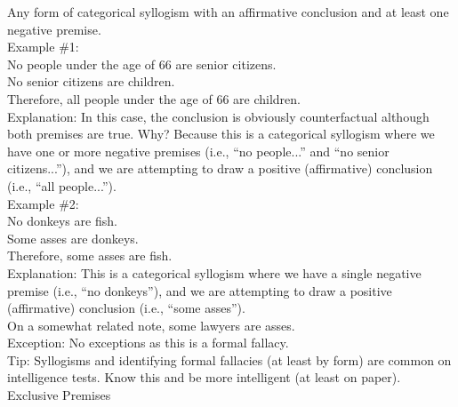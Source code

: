 \documentclass[a4paper,12pt,single,pdftex]{scrartcl}
\begin{document}
    
      Any form of categorical syllogism with an affirmative conclusion and at least one negative premise.
    \\

    
      Example \#1:
    \\

    
      No people under the age of 66 are senior citizens.
    \\

    
      No senior citizens are children.
    \\

    
      Therefore, all people under the age of 66 are children.
    \\

    
      Explanation: In this case, the conclusion is obviously counterfactual although both premises are true.  Why?  Because this is a categorical syllogism where we have one or more negative premises (i.e., “no people...” and “no senior citizens...”), and we are attempting to draw a positive (affirmative) conclusion (i.e., “all people...”). 
    \\

    
      Example \#2:
    \\

    
      No donkeys are fish.
    \\

    
      Some asses are donkeys.
    \\

    
      Therefore, some asses are fish.
    \\

    
      Explanation: This is a categorical syllogism where we have a single negative premise (i.e., “no donkeys”), and we are attempting to draw a positive (affirmative) conclusion (i.e., “some asses”).
    \\

    
      On a somewhat related note, some lawyers are asses.
    \\

    
      Exception: No exceptions as this is a formal fallacy.
    \\

    
      Tip: Syllogisms and identifying formal fallacies (at least by form) are common on intelligence tests. Know this and be more intelligent (at least on paper).
    \\

  

Exclusive Premises
    
\end{document}
